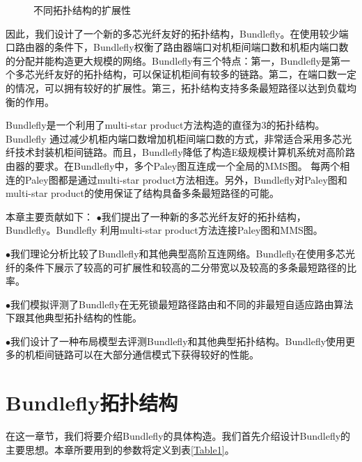 \begin{figure}[t]
   \begin{minipage}[t]{\textwidth}
   \centering

  \caption{不同拓扑结构的扩展性}
  \label{constructdfv6}
  \end{minipage}
  \end{figure}

  因此，我们设计了一个新的多芯光纤友好的拓扑结构，Bundlefly。在使用较少端口路由器的条件下，Bundlefly权衡了路由器端口对机柜间端口数和机柜内端口数的分配并能构造更大规模的网络。Bundlefly有三个特点：第一，Bundlefly是第一个多芯光纤友好的拓扑结构，可以保证机柜间有较多的链路。第二，在端口数一定的情况，可以拥有较好的扩展性。第三，拓扑结构支持多条最短路径以达到负载均衡的作用。

  Bundlefly是一个利用了multi-star product方法构造的直径为3的拓扑结构。Bundlefly 通过减少机柜内端口数增加机柜间端口数的方式，非常适合采用多芯光纤技术封装机柜间链路。而且，Bundlefly降低了构造E级规模计算机系统对高阶路由器的要求。在Bundlefly中，多个Paley图互连成一个全局的MMS图。 每两个相连的Paley图都是通过multi-star product方法相连。另外，Bundlefly对Paley图和multi-star product的使用保证了结构具备多条最短路径的可能。

  本章主要贡献如下：
  $\bullet$我们提出了一种新的多芯光纤友好的拓扑结构，Bundlefly。Bundlefly 利用multi-star product方法连接Paley图和MMS图。

  $\bullet$我们理论分析比较了Bundlefly和其他典型高阶互连网络。Bundlefly在使用多芯光纤的条件下展示了较高的可扩展性和较高的二分带宽以及较高的多条最短路径的比率。

   $\bullet$我们模拟评测了Bundlefly在无死锁最短路径路由和不同的非最短自适应路由算法下跟其他典型拓扑结构的性能。

   $\bullet$我们设计了一种布局模型去评测Bundlefly和其他典型拓扑结构。Bundlefly使用更多的机柜间链路可以在大部分通信模式下获得较好的性能。

\section{Bundlefly拓扑结构}

在这一章节，我们将要介绍Bundlefly的具体构造。我们首先介绍设计Bundlefly的主要思想。本章所要用到的参数将定义到表\ref{Table1}。

